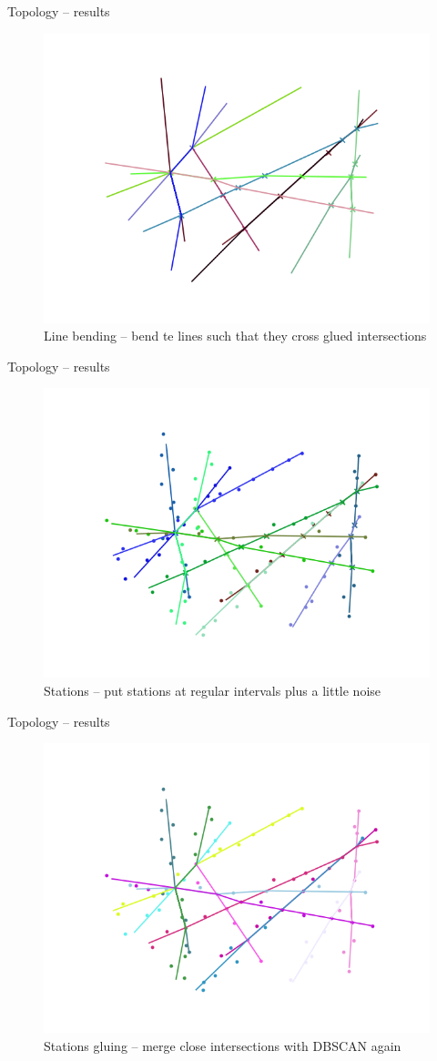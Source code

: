 \begin{frame}{Topology -- results}
	\begin{figure}
		\centering
		\includegraphics[width=0.7\linewidth]{images/net_4.png}
		\caption{Line bending -- bend te lines such that they cross glued intersections}
	\end{figure}
\end{frame}
\begin{frame}{Topology -- results}
	\begin{figure}
		\centering
		\includegraphics[width=0.7\linewidth]{images/net_5.png}
		\caption{Stations -- put stations at regular intervals plus a little noise}
	\end{figure}
\end{frame}
\begin{frame}{Topology -- results}
	\begin{figure}
		\centering
		\includegraphics[width=0.7\linewidth]{images/net_6.png}
		\caption{Stations gluing -- merge close intersections with DBSCAN again}
	\end{figure}
\end{frame}

